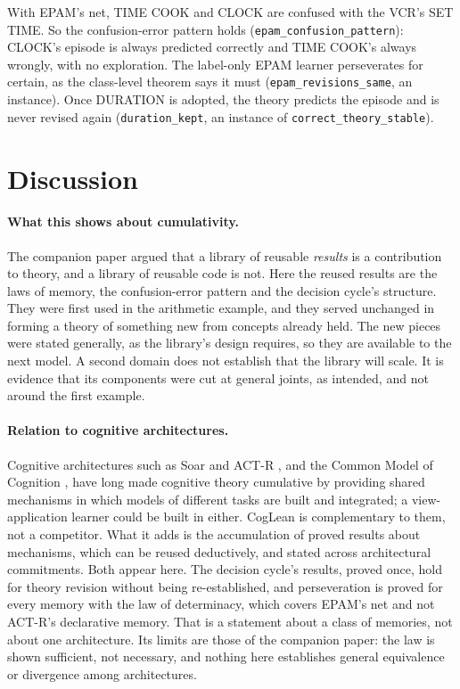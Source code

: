 \documentclass[11pt]{article}
\newcommand{\lean}[1]{\texttt{#1}}
\begin{document}
With EPAM's net, TIME COOK and CLOCK are confused with the VCR's SET TIME. So the confusion-error pattern holds (\lean{epam\_confusion\_pattern}): CLOCK's episode is always predicted correctly and TIME COOK's always wrongly, with no exploration. The label-only EPAM learner perseverates for certain, as the class-level theorem says it must (\lean{epam\_revisions\_same}, an instance). Once DURATION is adopted, the theory predicts the episode and is never revised again (\lean{duration\_kept}, an instance of \lean{correct\_theory\_stable}).

\section{Discussion}
\label{sec:discussion}

\paragraph{What this shows about cumulativity.} The companion paper argued that a library of reusable \emph{results} is a contribution to theory, and a library of reusable code is not. Here the reused results are the laws of memory, the confusion-error pattern and the decision cycle's structure. They were first used in the arithmetic example, and they served unchanged in forming a theory of something new from concepts already held. The new pieces were stated generally, as the library's design requires, so they are available to the next model. A second domain does not establish that the library will scale. It is evidence that its components were cut at general joints, as intended, and not around the first example.

\paragraph{Relation to cognitive architectures.} Cognitive architectures such as Soar \citep{laird1987,laird2012} and ACT-R \citep{anderson2007}, and the Common Model of Cognition \citep{laird2017}, have long made cognitive theory cumulative by providing shared mechanisms in which models of different tasks are built and integrated; a view-application learner could be built in either. CogLean is complementary to them, not a competitor. What it adds is the accumulation of proved results about mechanisms, which can be reused deductively, and stated across architectural commitments. Both appear here. The decision cycle's results, proved once, hold for theory revision without being re-established, and perseveration is proved for every memory with the law of determinacy, which covers EPAM's net and not ACT-R's declarative memory. That is a statement about a class of memories, not about one architecture. Its limits are those of the companion paper: the law is shown sufficient, not necessary, and nothing here establishes general equivalence or divergence among architectures.
\end{document}
